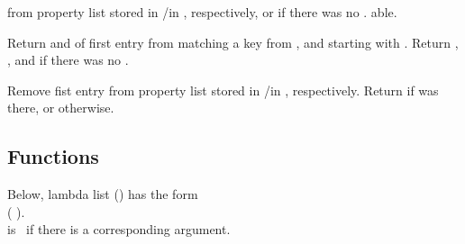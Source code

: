 \begin{LIST}{1cm}
  \label{:property_lists}
  {
   from property list stored in
  /in , respectively, or  if
  there was no . able.
  }

  {
  Return  and  of first entry from 
  matching a key from , and  starting with . Return \retval{\NIL},
  \retvalii{\NIL}, and  \retvaliii{\NIL} if there was no .
  }

  {
  Remove fist entry  from property list stored in
  /in , respectively. Return \retval{\T} if 
  was there, or \retval{\NIL} otherwise.
  }

\end{LIST}


\subsection{Functions}
\label{section:Functions}


Below, lambda list () has the form\\
(
).\\
 is \T\ if there is a corresponding argument.

